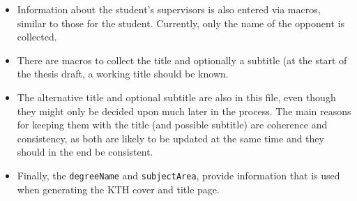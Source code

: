 \documentclass[12pt, twoside]{article}
\newif\ifinswedish
\begin{document}
\begin{itemize}
    \item Information about the student's supervisors is also entered via macros, similar to those for the student. Currently, only the name of the opponent is collected.

    \item There are macros to collect the title and optionally a subtitle (at the start of the thesis draft, a working title should be known.

    \item The alternative title and optional subtitle are also in this file, even though they might only be decided upon much later in the process. The main reasons for keeping them with the title (and possible subtitle) are coherence and consistency, as both are likely to be updated at the same time and they should in the end be consistent. 
    
    \item Finally, the \texttt{degreeName} and \texttt{subjectArea}, provide information that is used when generating the \gls{KTH} cover and title page.
\end{itemize}


\cleardoublepage
\ifinswedish
\printglossary[style=mylong, type=\acronymtype, title={Lista över akronymer
och förkortningar}]
\else
\printnoidxglossary[type=\acronymtype, style=mylong, title={List of Acronyms and Abbreviations}]
\fi
\cleardoublepage


\renewcommand{\bibname}{References}

\printbibliography[heading=bibintoc, title={References}]
\end{document}
